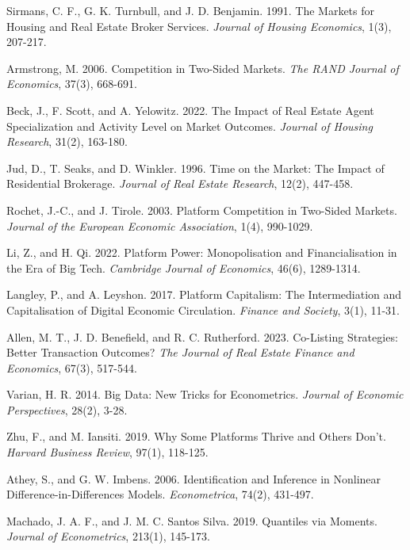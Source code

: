 \documentclass[11pt]{article}
\begin{document}
\begin{singlespace}
\begin{thebibliography}{}
  Sirmans, C. F., G. K. Turnbull, and J. D. Benjamin. 1991. The Markets for Housing and Real Estate Broker Services. \textit{Journal of Housing Economics}, 1(3), 207-217.
  
  Armstrong, M. 2006. Competition in Two-Sided Markets. \textit{The RAND Journal of Economics}, 37(3), 668-691.
  
  Beck, J., F. Scott, and A. Yelowitz. 2022. The Impact of Real Estate Agent Specialization and Activity Level on Market Outcomes. \textit{Journal of Housing Research}, 31(2), 163-180.
  
  Jud, D., T. Seaks, and D. Winkler. 1996. Time on the Market: The Impact of Residential Brokerage. \textit{Journal of Real Estate Research}, 12(2), 447-458.
  
  Rochet, J.-C., and J. Tirole. 2003. Platform Competition in Two-Sided Markets. \textit{Journal of the European Economic Association}, 1(4), 990-1029.
  
  Li, Z., and H. Qi. 2022. Platform Power: Monopolisation and Financialisation in the Era of Big Tech. \textit{Cambridge Journal of Economics}, 46(6), 1289-1314.
  
  Langley, P., and A. Leyshon. 2017. Platform Capitalism: The Intermediation and Capitalisation of Digital Economic Circulation. \textit{Finance and Society}, 3(1), 11-31.
  
  Allen, M. T., J. D. Benefield, and R. C. Rutherford. 2023. Co-Listing Strategies: Better Transaction Outcomes? \textit{The Journal of Real Estate Finance and Economics}, 67(3), 517-544.
  
  Varian, H. R. 2014. Big Data: New Tricks for Econometrics. \textit{Journal of Economic Perspectives}, 28(2), 3-28.
  
  Zhu, F., and M. Iansiti. 2019. Why Some Platforms Thrive and Others Don't. \textit{Harvard Business Review}, 97(1), 118-125.
  
  Athey, S., and G. W. Imbens. 2006. Identification and Inference in Nonlinear Difference-in-Differences Models. \textit{Econometrica}, 74(2), 431-497.%

Machado, J. A. F., and J. M. C. Santos Silva. 2019. Quantiles via Moments. \textit{Journal of Econometrics}, 213(1), 145-173.

  \end{thebibliography}
\end{singlespace}
\end{document}

